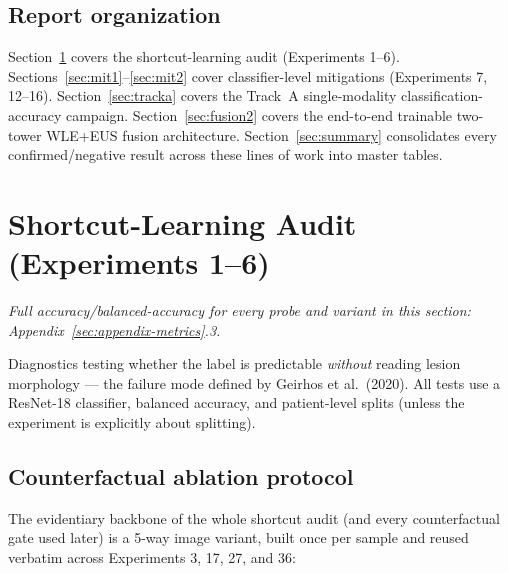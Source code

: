 \documentclass[10pt]{article}
\begin{document}
\subsection{Report organization}

Section~\ref{sec:audit} covers the shortcut-learning audit (Experiments 1--6). Sections~\ref{sec:mit1}--\ref{sec:mit2}
cover classifier-level mitigations (Experiments 7, 12--16). Section~\ref{sec:tracka} covers the Track~A
single-modality classification-accuracy campaign. Section~\ref{sec:fusion2} covers the end-to-end
trainable two-tower WLE+EUS fusion architecture. Section~\ref{sec:summary} consolidates every
confirmed/negative result across these lines of work into master tables.

\clearpage
\section{Shortcut-Learning Audit (Experiments 1--6)}
\label{sec:audit}

\noindent\textit{Full accuracy/balanced-accuracy for every probe and variant in this section: Appendix~\ref{sec:appendix-metrics}.3.}

Diagnostics testing whether the label is predictable \emph{without} reading lesion morphology --- the
failure mode defined by Geirhos et al.\ (2020). All tests use a ResNet-18 classifier, balanced accuracy,
and patient-level splits (unless the experiment is explicitly about splitting).

\subsection{Counterfactual ablation protocol}

The evidentiary backbone of the whole shortcut audit (and every counterfactual gate used later) is a
5-way image variant, built once per sample and reused verbatim across Experiments 3, 17, 27, and 36:
\end{document}
